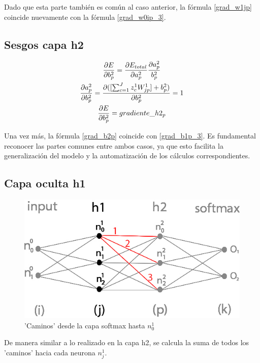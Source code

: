 Dado que esta parte también es común al caso anterior, la fórmula \ref{grad_w1jp} coincide nuevamente con la fórmula \ref{grad_w0ip_3}.


\subsection{Sesgos capa h2}

\begin{gather}
	\frac{\partial E}{\partial b^2_p} = \frac{\partial E_{total} }{\partial a^2_p }   \frac{\partial a^2_p}{b^2_p} \notag \\
	\frac{\partial a^2_p }{\partial b^2_p } = \frac{\partial ([\sum_{c=1}^{J} z^1_c   W^1_{jp}] + b^2_p) }{\partial b^2_p } = 1 \notag \\
	\frac{\partial E}{\partial b^2_p} = gradiente\_h2_p
	\label{grad_b2p}
\end{gather}

Una vez más, la fórmula \ref{grad_b2p} coincide con \ref{grad_b1p_3}. Es fundamental reconocer las partes comunes entre ambos casos, ya que esto facilita la generalización del modelo y la automatización de los cálculos correspondientes.

\subsection{Capa oculta h1}

\begin{figure}[H]
	\centering
	\includegraphics[scale=0.35]{imagenes/nn_h1_caminos_posibles.jpg}  
	\caption{'Caminos' desde la capa softmax hasta $n^1_0$}
	\label{nn_h1_caminos_posibles}
\end{figure}

De manera similar a lo realizado en la capa h2, se calcula la suma de todos los 'caminos' hacia cada neurona $n^1_j$. \\

